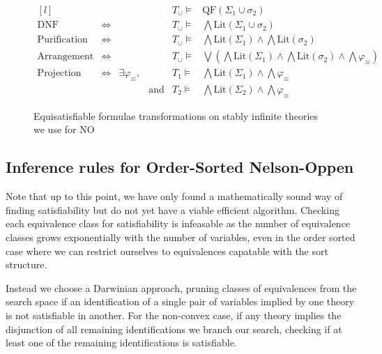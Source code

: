 \documentclass[]{article}
\renewcommand \phi {\varphi}
\newcommand \union      {\cup }
\newcommand \Or     {\bigvee}
\renewcommand \And    {\bigwedge}
\newcommand \QF       {\text{QF}}
\newcommand \Lit      {\text{Lit}}
\begin{document}
\begin{figure}
$$\begin{matrix*}[l]
                    &    &                        &     & T_{\union}  \models& \QF(\Sigma_1 \union \sigma_2)                                              \\
\text{DNF}          &\iff&                        &     & T_{\union}  \models& \And \Lit(\Sigma_1 \union \sigma_2)                                        \\
\text{Purification} &\iff&                        &     & T_{\union}  \models& \And \Lit(\Sigma_1) \land \And\Lit(\sigma_2)                                \\
\text{Arrangement}  &\iff&                        &     & T_{\union}  \models& \Or ( \And \Lit(\Sigma_1) \land \And\Lit(\sigma_2) \land \And \phi_{\equiv} )\\
\text{Projection}   &\iff& \exists \phi_{\equiv}, &     & T_1 \models        & \And \Lit(\Sigma_1) \land \And \phi_{\equiv}                                \\
                    &    &                        &\text{and} & T_2 \models        & \And \Lit(\Sigma_2) \land \And \phi_{\equiv}
\end{matrix*}$$
\caption{Equisatisfiable formulae transformations on stably infinite theories we use for NO}
\end{figure}

\hypertarget{inference-rules-for-order-sorted-nelson-oppen}{%
\subsection{Inference rules for Order-Sorted
Nelson-Oppen}\label{inference-rules-for-order-sorted-nelson-oppen}}

Note that up to this point, we have only found a mathematically sound
way of finding satisfiability but do not yet have a viable efficient
algorithm. Checking each equivalence class for satisfiability is
infeasable as the number of equivalence classes grows exponentially with
the number of variables, even in the order sorted case where we can
restrict ourselves to equivalences capatable with the sort structure.

Instead we choose a Darwinian approach, pruning classes of equivalences
from the search space if an identification of a single pair of variables
implied by one theory is not satisfiable in another. For the non-convex
case, if any theory implies the disjunction of all remaining
identifications we branch our search, checking if at least one of the
remaining identifications is satisfiable.
\end{document}
